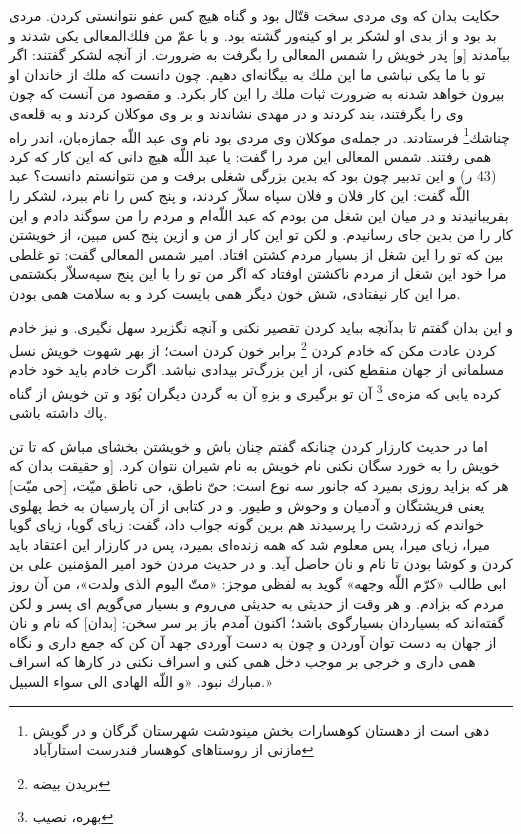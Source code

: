 حكايت بدان كه وى مردى سخت قتّال بود و گناه هيچ كس عفو نتوانستى كردن. مردى بد بود و از بدى او لشكر بر او كينه‌ور گشته بود. و با عمّ من فلك‌المعالى يكى شدند و بيآمدند [و] پدر خويش را شمس المعالى را بگرفت به ضرورت. از آنچه لشكر گفتند: اگر تو با ما يكى نباشى ما اين ملك به بيگانه‌اى دهيم. چون دانست كه ملك از خاندان او بيرون خواهد شدنه به ضرورت ثبات ملك را اين كار بكرد. و مقصود من آنست كه چون وى را بگرفتند، بند كردند و در مهدى نشاندند و بر وى موكلان كردند و به قلعه‌ی چناشك\footnote{دهی است از دهستان کوهسارات بخش مینودشت شهرستان گرگان و در گویش مازنی از روستاهای کوهسار فندرست استارآباد} فرستادند. در جمله‌ی موكلان وى مردى بود نام وى عبد اللّه جمازه‌بان، اندر راه همى رفتند. شمس المعالى اين مرد را گفت: يا عبد اللّه هيچ دانى كه اين كار كه كرد (43 ر) و اين تدبير چون بود كه بدين بزرگى شغلى برفت و من نتوانستم دانست‌؟ عبد اللّه گفت: اين كار فلان و فلان سپاه سلاّر كردند، و پنج كس را نام ببرد، لشكر را بفريبانيدند و در ميان اين شغل من بودم كه عبد اللّه‌ام و مردم را من سوگند دادم و اين كار را من بدين جاى رسانيدم. و لكن تو اين كار از من و ازين پنج كس مبين، از خويشتن بين كه تو را اين شغل از بسيار مردم كشتن افتاد. امير شمس المعالى گفت: تو غلطى مرا خود اين شغل از مردم ناكشتن اوفتاد كه اگر من تو را با اين پنج سپه‌سلاّر بكشتمى مرا اين كار نيفتادى، شش خون ديگر همى بايست كرد و به سلامت همى بودن.

و اين بدان گفتم تا بدآنچه ببايد كردن تقصير نكنى و آنچه نگزيرد سهل نگيرى. و نيز خادم كردن عادت مكن كه خادم كردن \footnote{بریدن بیضه} برابر خون كردن است؛ از بهر شهوت خويش نسل مسلمانى از جهان منقطع كنى، از اين بزرگ‌تر بيدادى نباشد. اگرت خادم بايد خود خادم كرده يابى كه مزه‌ی \footnote{بهره، نصیب} آن تو برگيرى و بزهِ آن به گردن ديگران بُوَد و تن خويش از گناه پاك داشته باشى.

اما در حديث كارزار كردن چنانكه گفتم چنان باش و خويشتن بخشاى مباش كه تا تن خويش را به خورد سگان نكنى نام خويش به نام شيران نتوان كرد. [و حقيقت بدان كه هر كه بزايد روزى بميرد كه جانور سه نوع است: حىّ ناطق، حى ناطق ميّت، [حى ميّت] يعنى فريشتگان و آدميان و وحوش و طيور. و در كتابى از آن پارسيان به خط پهلوى خواندم كه زردشت را پرسيدند هم برين گونه جواب داد، گفت: زياى گويا، زياى گويا ميرا، زياى ميرا، پس معلوم شد كه همه زنده‌اى بميرد، پس در كارزار اين اعتقاد بايد كردن و كوشا بودن تا نام و نان حاصل آيد. و در حديث مردن خود امير المؤمنين على بن ابى طالب «كرّم اللّه وجهه» گويد به لفظى موجز: «متّ اليوم الذى ولدت»، من آن روز مردم كه بزادم. و هر وقت از حديثى به حديثى مى‌روم و بسيار مي‌گويم اى پسر و لكن گفته‌اند كه بسياردان بسيارگوى باشد؛ اكنون آمدم باز بر سر سخن: [بدان] كه نام و نان از جهان به دست توان آوردن و چون به دست آوردى جهد آن كن كه جمع دارى و نگاه همى دارى و خرجى بر موجب دخل همى كنى و اسراف نكنى در كارها كه اسراف مبارك نبود. «و اللّه الهادى الى سواء السبيل.»


\newpage

